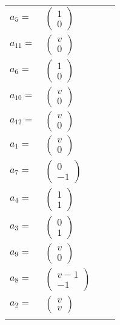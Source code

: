 \documentclass[1p]{elsarticle_modified}
\theoremstyle{definition}
\begin{document}
\begin{tabular}{m{7pt} m{180pt} m{7pt} m{180pt} }
\flushright $a_{5}=$&$\begin{pmatrix}1\\0\end{pmatrix}$ \\
\flushright $a_{11}=$&$\begin{pmatrix}v\\0\end{pmatrix}$ \\
\flushright $a_{6}=$&$\begin{pmatrix}1\\0\end{pmatrix}$ \\
\flushright $a_{10}=$&$\begin{pmatrix}v\\0\end{pmatrix}$ \\
\flushright $a_{12}=$&$\begin{pmatrix}v\\0\end{pmatrix}$ \\
\flushright $a_{1}=$&$\begin{pmatrix}v\\0\end{pmatrix}$ \\
\flushright $a_{7}=$&$\begin{pmatrix}0\\-1\end{pmatrix}$ \\
\flushright $a_{4}=$&$\begin{pmatrix}1\\1\end{pmatrix}$ \\
\flushright $a_{3}=$&$\begin{pmatrix}0\\1\end{pmatrix}$ \\
\flushright $a_{9}=$&$\begin{pmatrix}v\\0\end{pmatrix}$ \\
\flushright $a_{8}=$&$\begin{pmatrix}v-1\\-1\end{pmatrix}$ \\
\flushright $a_{2}=$&$\begin{pmatrix}v\\v\end{pmatrix}$\\&\end{tabular}
\end{document}
